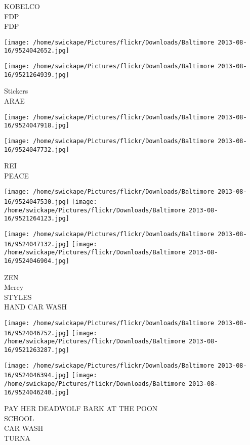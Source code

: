\documentclass[10pt,letterpaper]{article}
\begin{document}
KOBELCO\\
FDP\\
FDP\\
\pagebreak

\texttt{[image: /home/swickape/Pictures/flickr/Downloads/Baltimore 2013-08-16/9524042652.jpg]}

\vspace{0.25in}
\texttt{[image: /home/swickape/Pictures/flickr/Downloads/Baltimore 2013-08-16/9521264939.jpg]}

Stickers\\
ARAE\\
\pagebreak

\texttt{[image: /home/swickape/Pictures/flickr/Downloads/Baltimore 2013-08-16/9524047918.jpg]}

\vspace{0.25in}
\texttt{[image: /home/swickape/Pictures/flickr/Downloads/Baltimore 2013-08-16/9524047732.jpg]}

REI\\
PEACE\\
\pagebreak

\texttt{[image: /home/swickape/Pictures/flickr/Downloads/Baltimore 2013-08-16/9524047530.jpg]}
\texttt{[image: /home/swickape/Pictures/flickr/Downloads/Baltimore 2013-08-16/9521264123.jpg]}

\texttt{[image: /home/swickape/Pictures/flickr/Downloads/Baltimore 2013-08-16/9524047132.jpg]}
\texttt{[image: /home/swickape/Pictures/flickr/Downloads/Baltimore 2013-08-16/9524046904.jpg]}

ZEN\\
Mercy\\
STYLES\\
HAND CAR WASH\\
\pagebreak

\texttt{[image: /home/swickape/Pictures/flickr/Downloads/Baltimore 2013-08-16/9524046752.jpg]}
\texttt{[image: /home/swickape/Pictures/flickr/Downloads/Baltimore 2013-08-16/9521263287.jpg]}

\texttt{[image: /home/swickape/Pictures/flickr/Downloads/Baltimore 2013-08-16/9524046394.jpg]}
\texttt{[image: /home/swickape/Pictures/flickr/Downloads/Baltimore 2013-08-16/9524046240.jpg]}

PAY HER DEADWOLF BARK AT THE POON\\
SCHOOL\\
CAR WASH\\
TURNA\\
\pagebreak
\end{document}
